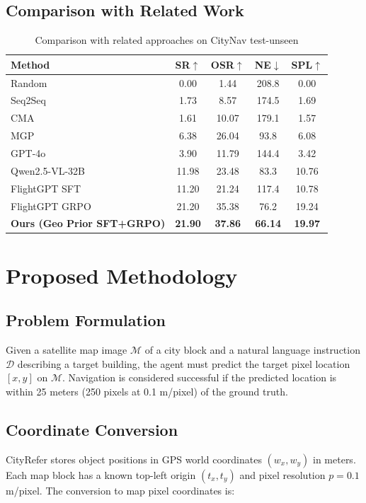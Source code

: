 \documentclass[conference]{IEEEtran}
\begin{document}
\subsection{Comparison with Related Work}

\begin{table}[h]
\centering
\caption{Comparison with related approaches on CityNav test-unseen}
\label{tab:related}
\begin{tabular}{lcccc}
\toprule
Method & SR$\uparrow$ & OSR$\uparrow$ & NE$\downarrow$ & SPL$\uparrow$ \\
\midrule
Random & 0.00 & 1.44 & 208.8 & 0.00 \\
Seq2Seq \cite{seq2seq} & 1.73 & 8.57 & 174.5 & 1.69 \\
CMA \cite{aerialvln} & 1.61 & 10.07 & 179.1 & 1.57 \\
MGP \cite{citynav} & 6.38 & 26.04 & 93.8 & 6.08 \\
GPT-4o \cite{gpt4o} & 3.90 & 11.79 & 144.4 & 3.42 \\
Qwen2.5-VL-32B \cite{qwen25vl} & 11.98 & 23.48 & 83.3 & 10.76 \\
FlightGPT SFT \cite{flightgpt} & 11.20 & 21.24 & 117.4 & 10.78 \\
FlightGPT GRPO \cite{flightgpt} & 21.20 & 35.38 & 76.2 & 19.24 \\
\midrule
\textbf{Ours (Geo Prior SFT+GRPO)} & \textbf{21.90} & \textbf{37.86} & \textbf{66.14} & \textbf{19.97} \\
\bottomrule
\end{tabular}
\end{table}

\section{Proposed Methodology}

\subsection{Problem Formulation}
Given a satellite map image $\mathcal{M}$ of a city block and a natural language instruction $\mathcal{D}$ describing a target building, the agent must predict the target pixel location $[x, y]$ on $\mathcal{M}$. Navigation is considered successful if the predicted location is within 25 meters (250 pixels at 0.1 m/pixel) of the ground truth.

\subsection{Coordinate Conversion}
CityRefer stores object positions in GPS world coordinates $(w_x, w_y)$ in meters. Each map block has a known top-left origin $(t_x, t_y)$ and pixel resolution $p = 0.1$ m/pixel. The conversion to map pixel coordinates is:
\end{document}
